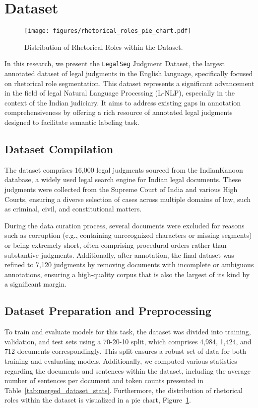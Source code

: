 \section{Dataset}
\begin{figure}[t] %
    \centering 
    \texttt{[image: figures/rhetorical\_roles\_pie\_chart.pdf]} 
    \caption{Distribution of Rhetorical Roles within the Dataset.}
    \label{pie-chart}
\end{figure}
In this research, we present the \texttt{LegalSeg} Judgment Dataset, the largest annotated dataset of legal judgments in the English language, specifically focused on rhetorical role segmentation. This dataset represents a significant advancement in the field of legal Natural Language Processing (L-NLP), especially in the context of the Indian judiciary. It aims to address existing gaps in annotation comprehensiveness by offering a rich resource of annotated legal judgments designed to facilitate semantic labeling task.

\subsection{Dataset Compilation}
The dataset comprises 16,000 legal judgments sourced from the IndianKanoon database, a widely used legal search engine for Indian legal documents. These judgments were collected from the Supreme Court of India and various High Courts, ensuring a diverse selection of cases across multiple domains of law, such as criminal, civil, and constitutional matters.  

During the data curation process, several documents were excluded for reasons such as corruption (e.g., containing unrecognized characters or missing segments) or being extremely short, often comprising procedural orders rather than substantive judgments. Additionally, after annotation, the final dataset was refined to 7,120 judgments by removing documents with incomplete or ambiguous annotations, ensuring a high-quality corpus that is also the largest of its kind by a significant margin.

\subsection{Dataset Preparation and Preprocessing}
To train and evaluate models for this task, the dataset was divided into training, validation, and test sets using a 70-20-10 split, which comprises 4,984, 1,424, and 712 documents correspondingly. This split ensures a robust set of data for both training and evaluating models. Additionally, we computed various statistics regarding the documents and sentences within the dataset, including the average number of sentences per document and token counts presented in Table~\ref{tab:merged_dataset_stats}. Furthermore, the distribution of rhetorical roles within the dataset is visualized in a pie chart, Figure~\ref{pie-chart}.


